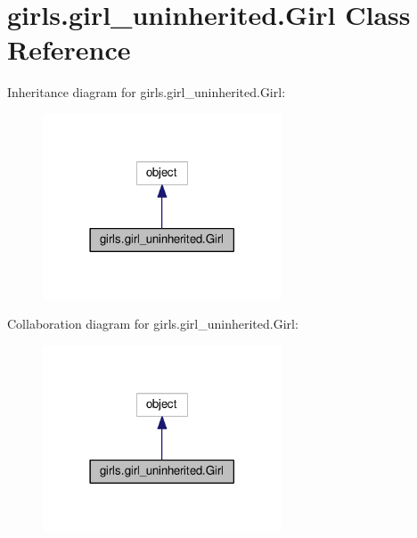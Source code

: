 \hypertarget{classgirls_1_1girl__uninherited_1_1_girl}{}\section{girls.\+girl\+\_\+uninherited.\+Girl Class Reference}
\label{classgirls_1_1girl__uninherited_1_1_girl}


Inheritance diagram for girls.\+girl\+\_\+uninherited.\+Girl\+:
\nopagebreak
\begin{figure}[H]
\begin{center}
\leavevmode
\includegraphics[width=201pt]{classgirls_1_1girl__uninherited_1_1_girl__inherit__graph}
\end{center}
\end{figure}


Collaboration diagram for girls.\+girl\+\_\+uninherited.\+Girl\+:
\nopagebreak
\begin{figure}[H]
\begin{center}
\leavevmode
\includegraphics[width=201pt]{classgirls_1_1girl__uninherited_1_1_girl__coll__graph}
\end{center}
\end{figure}
